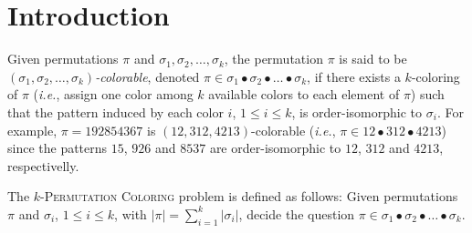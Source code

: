 \section{Introduction}
\label{section:Introduction}

Given permutations $\pi$ and $\sigma_1, \sigma_2, \ldots, \sigma_k$,
the permutation $\pi$ is said to be
\emph{$(\sigma_1, \sigma_2, \ldots, \sigma_k)$-colorable},
denoted $\pi \in \sigma_1 \bullet \sigma_2 \bullet \dots \bullet \sigma_k$,
if there exists a $k$-coloring of $\pi$ (\emph{i.e.}, assign one color
among $k$ available colors to each element of $\pi$) such that the
pattern induced by each color $i$, $1 \leq i \leq k$, is order-isomorphic
to $\sigma_i$.
For example, $\pi = 192854367$ is $(12, 312, 4213)$-colorable
(\emph{i.e.}, $\pi \in 12 \bullet 312 \bullet 4213$) since
the patterns $15$, $926$ and $8537$ are order-isomorphic to
$12$, $312$ and $4213$, respectivelly.

The \textsc{$k$-Permutation Coloring} problem is defined as follows:
Given permutations $\pi$ and $\sigma_i$, $1 \leq i \leq k$, with
$|\pi| = \sum_{i=1}^k |\sigma_i|$,
decide the question
$\pi \in \sigma_1 \bullet \sigma_2 \bullet \dots \bullet \sigma_k$.
